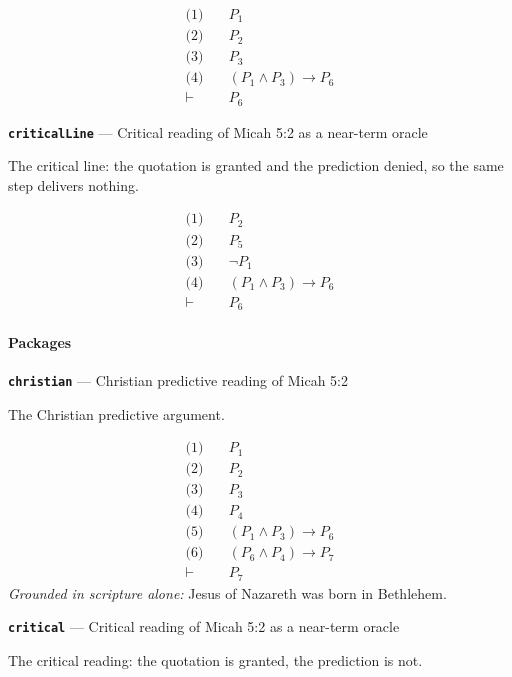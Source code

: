 \documentclass[11pt]{article}
\begin{document}
\begin{align*}
  \text{(1)} \quad & P_{1} \\
  \text{(2)} \quad & P_{2} \\
  \text{(3)} \quad & P_{3} \\
  \text{(4)} \quad & (P_{1} \land P_{3}) \rightarrow P_{6} \\
  \vdash \quad & P_{6}
\end{align*}
\par\medskip\noindent\textbf{\texttt{critical\allowbreak{}Line}} --- Critical reading of Micah 5:2 as a near-term oracle\par\nobreak\noindent
The critical line: the quotation is granted and the prediction denied, so the same step delivers nothing.

\begin{align*}
  \text{(1)} \quad & P_{2} \\
  \text{(2)} \quad & P_{5} \\
  \text{(3)} \quad & \lnot P_{1} \\
  \text{(4)} \quad & (P_{1} \land P_{3}) \rightarrow P_{6} \\
  \vdash \quad & P_{6}
\end{align*}
\paragraph*{Packages}
\leavevmode\par
\par\medskip\noindent\textbf{\texttt{christian}} --- Christian predictive reading of Micah 5:2\par\nobreak\noindent
The Christian predictive argument.

\begin{align*}
  \text{(1)} \quad & P_{1} \\
  \text{(2)} \quad & P_{2} \\
  \text{(3)} \quad & P_{3} \\
  \text{(4)} \quad & P_{4} \\
  \text{(5)} \quad & (P_{1} \land P_{3}) \rightarrow P_{6} \\
  \text{(6)} \quad & (P_{6} \land P_{4}) \rightarrow P_{7} \\
  \vdash \quad & P_{7}
\end{align*}
\emph{Grounded in scripture alone:} Jesus of Nazareth was born in Bethlehem.
\par\medskip\noindent\textbf{\texttt{critical}} --- Critical reading of Micah 5:2 as a near-term oracle\par\nobreak\noindent
The critical reading: the quotation is granted, the prediction is not.
\end{document}
